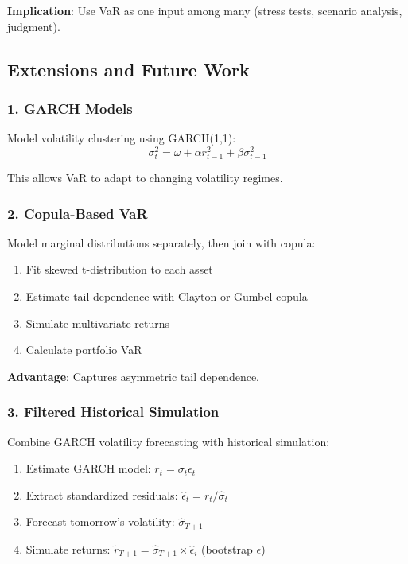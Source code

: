 \documentclass[12pt,a4paper]{article}
\begin{document}
\textbf{Implication}: Use VaR as one input among many (stress tests, scenario analysis, judgment).

\subsection{Extensions and Future Work}

\subsubsection{1. GARCH Models}

Model volatility clustering using GARCH(1,1):
\begin{equation}
\sigma_t^2 = \omega + \alpha r_{t-1}^2 + \beta \sigma_{t-1}^2
\end{equation}

This allows VaR to adapt to changing volatility regimes.

\subsubsection{2. Copula-Based VaR}

Model marginal distributions separately, then join with copula:
\begin{enumerate}
    \item Fit skewed t-distribution to each asset
    \item Estimate tail dependence with Clayton or Gumbel copula
    \item Simulate multivariate returns
    \item Calculate portfolio VaR
\end{enumerate}

\textbf{Advantage}: Captures asymmetric tail dependence.

\subsubsection{3. Filtered Historical Simulation}

Combine GARCH volatility forecasting with historical simulation:
\begin{enumerate}
    \item Estimate GARCH model: $r_t = \sigma_t \epsilon_t$
    \item Extract standardized residuals: $\hat{\epsilon}_t = r_t / \hat{\sigma}_t$
    \item Forecast tomorrow's volatility: $\hat{\sigma}_{T+1}$
    \item Simulate returns: $\tilde{r}_{T+1} = \hat{\sigma}_{T+1} \times \hat{\epsilon}_i$ (bootstrap $\epsilon$)
\end{enumerate}
\end{document}
